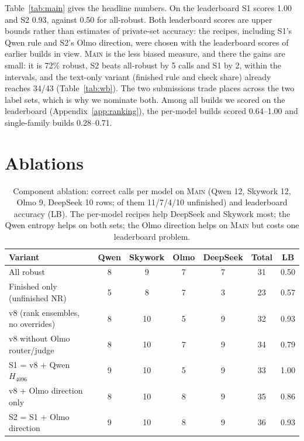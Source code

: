 \documentclass{article}
\newcommand{\sone}{\textsc{S1}}
\newcommand{\stwo}{\textsc{S2}}
\begin{document}
Table~\ref{tab:main} gives the headline numbers. On the leaderboard \sone{} scores 1.00 and \stwo{} 0.93, against 0.50 for all-robust. Both leaderboard scores are upper bounds rather than estimates of private-set accuracy: the recipes, including \sone{}'s Qwen rule and \stwo{}'s Olmo direction, were chosen with the leaderboard scores of earlier builds in view. \textsc{Main} is the less biased measure, and there the gains are small: it is 72\% robust, \stwo{} beats all-robust by 5 calls and \sone{} by 2, within the intervals, and the text-only variant (finished rule and check share) already reaches 34/43 (Table~\ref{tab:wb}). The two submissions trade places across the two label sets, which is why we nominate both. Among all builds we scored on the leaderboard (Appendix~\ref{app:ranking}), the per-model builds scored 0.64--1.00 and single-family builds 0.28--0.71.

\section{Ablations}
\label{sec:ablations}
\begin{table}[t]
\caption{Component ablation: correct calls per model on \textsc{Main} (Qwen 12, Skywork 12, Olmo 9, DeepSeek 10 rows; of them 11/7/4/10 unfinished) and leaderboard accuracy (LB). The per-model recipes help DeepSeek and Skywork most; the Qwen entropy helps on both sets; the Olmo direction helps on \textsc{Main} but costs one leaderboard problem.}
\label{tab:ablation}
\centering\small
\begin{tabular}{lcccccc}
\toprule
Variant & Qwen & Skywork & Olmo & DeepSeek & Total & LB \\
\midrule
All robust                         & 8 & 9  & 7 & 7 & 31 & 0.50 \\
Finished only (unfinished NR)      & 5 & 8  & 7 & 3 & 23 & 0.57 \\
v8 (rank ensembles, no overrides)  & 8 & 10 & 5 & 9 & 32 & 0.93 \\
v8 without Olmo router/judge       & 8 & 10 & 7 & 9 & 34 & 0.79 \\
\sone{} = v8 + Qwen $H_{4096}$     & 9 & 10 & 5 & 9 & 33 & 1.00 \\
v8 + Olmo direction only           & 8 & 10 & 8 & 9 & 35 & 0.86 \\
\stwo{} = \sone{} + Olmo direction & 9 & 10 & 8 & 9 & 36 & 0.93 \\
\bottomrule
\end{tabular}
\end{table}
\end{document}
